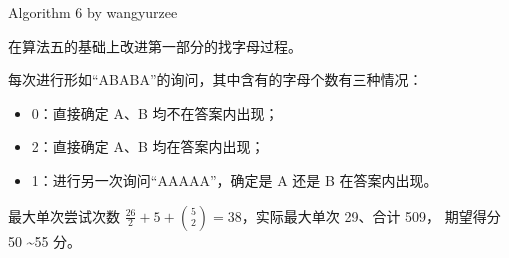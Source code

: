 \documentclass[UTF8]{beamer}
\begin{document}
\begin{frame}{Algorithm 6 by wangyurzee}

在算法五的基础上改进第一部分的找字母过程。

\pause 每次进行形如“ABABA”的询问，其中含有的字母个数有三种情况：
\begin{itemize}
    \item 0：直接确定 A、B 均不在答案内出现；
    \item 2：直接确定 A、B 均在答案内出现；
    \item 1：进行另一次询问“AAAAA”，确定是 A 还是 B 在答案内出现。
\end{itemize} 

\pause 最大单次尝试次数 $\frac{26}{2} + 5 + \binom{5}{2} = 38$，实际最大单次 29、合计 509，
期望得分 50 \textasciitilde 55 分。

\end{frame}
\end{document}
